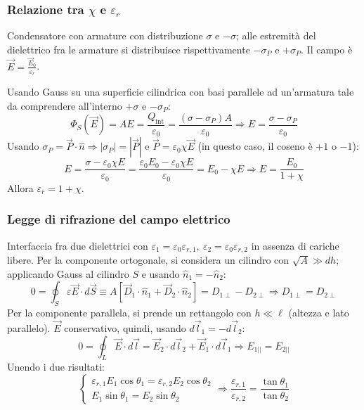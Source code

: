 \documentclass[10pt, a4paper]{scrartcl}
\numberwithin{equation}{subsection}
\theoremstyle{style1}
\begin{document}
\subsubsection{Relazione tra $\chi $ e $\varepsilon _r$}
Condensatore con armature con distribuzione $\sigma $ e $-\sigma $; alle estremit\`a del dielettrico fra le armature si distribuisce rispettivamente $-\sigma _P$ e $+ \sigma _P$. Il campo \`e $\vec{E} = \frac{\vec{E}_0}{\varepsilon _r}$.

Usando Gauss su una superficie cilindrica con basi parallele ad un'armatura tale da comprendere all'interno $+\sigma$ e $-\sigma _P$:
\begin{equation}
	\Phi_S(\vec{E}) = AE = \frac{Q_\text{int}}{\varepsilon _0} = \frac{(\sigma - \sigma _P)A}{\varepsilon _0} \Rightarrow E = \frac{\sigma -\sigma _P}{\varepsilon _0}
\end{equation}
Usando $\sigma _P = \vec{P}\cdot \hat{n}\Rightarrow \left\lvert \sigma _P \right\rvert = \left\lvert \vec{P} \right\rvert $ e $\vec{P} = \varepsilon _0 \chi \vec{E}$ (in questo caso, il coseno \`e $+1$ o $-1$):
\begin{equation}
	E = \frac{\sigma -\varepsilon _0 \chi E}{\varepsilon _0} = \frac{\varepsilon _0 E_0 - \varepsilon _0 \chi E}{\varepsilon _0}= E_0 - \chi E \Rightarrow E = \frac{E_0}{1+ \chi }
\end{equation}
Allora $\varepsilon _r = 1+\chi $.

\subsubsection{Legge di rifrazione del campo elettrico}
Interfaccia fra due dielettrici con $\varepsilon _1 = \varepsilon _0 \varepsilon _{r,1}, \ \varepsilon _2 = \varepsilon _0 \varepsilon _{r,2}  $ in assenza di cariche libere. Per la componente ortogonale, si considera un cilindro con $\sqrt{A} \gg dh$; applicando Gauss al cilindro $S$ e usando $\hat{n}_1 = - \hat{n}_2$:
\begin{equation}
	0=\oint_{S} \varepsilon \vec{E}\cdot d\vec{S} \equiv A\left[ \vec{D}_1 \cdot \hat{n}_1 + \vec{D}_2 \cdot \hat{n}_2 \right] = D_{1\perp} - D_{2 \perp} \Rightarrow D_{1\perp}  = D_{2\perp} 
\end{equation}
Per la componente parallela, si prende un rettangolo con $h\ll \ell $ (altezza e lato parallelo). $\vec{E}$ conservativo, quindi, usando $d\vec{l}_1 = -d\vec{l}_2$:
\begin{equation}
	0=\oint_{L} \vec{E}\cdot d\vec{l} = \vec{E}_2 \cdot d\vec{l}_2 + \vec{E}_1 \cdot d\vec{l}_1 \Rightarrow E_{1 | |} = E_{2 | |}  
\end{equation}
Unendo i due risultati:
\begin{equation}
	\begin{cases}
		 \varepsilon _{r,1}  E_{1}\cos\theta _1  = \varepsilon _{r,2} E_{2}\cos\theta _2 \\
		 E_1 \sin \theta _1 =  E_2\sin \theta _2 
	\end{cases} \Rightarrow \frac{\varepsilon _{r,1} }{\varepsilon _{r,2} } = \frac{\tan \theta _1}{\tan\theta _2}
\end{equation}
\end{document}
